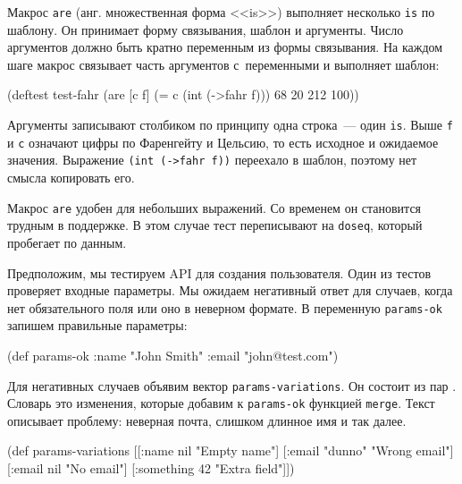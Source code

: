 
Макрос \verb|are| (анг. множественная форма <<is>>) выполняет несколько
\verb|is| по шаблону. Он принимает форму связывания, шаблон и аргументы. Число
аргументов должно быть кратно переменным из формы связывания. На каждом шаге
макрос связывает часть аргументов с~переменными и выполняет шаблон:

\begin{english}
  \begin{clojure}
(deftest test-fahr
  (are [c f] (= c (int (->fahr f)))
    68 20
    212 100))
  \end{clojure}
\end{english}

Аргументы записывают столбиком по принципу одна строка~--- один
\verb|is|. Выше \verb|f| и \verb|c| означают цифры по Фаренгейту и
Цельсию, то есть исходное и ожидаемое значения. Выражение \verb|(int (->fahr f))|
переехало в шаблон, поэтому нет смысла копировать его.

Макрос \verb|are| удобен для небольших выражений. Со временем он становится
трудным в поддержке. В этом случае тест переписывают на \verb|doseq|, который
пробегает по данным.

Предположим, мы тестируем API для создания пользователя. Один из тестов
проверяет входные параметры. Мы ожидаем негативный ответ для случаев, когда нет
обязательного поля или оно в неверном формате. В переменную \verb|params-ok|
запишем правильные параметры:

\begin{english}
  \begin{clojure}
(def params-ok {:name "John Smith" :email "john@test.com"})
  \end{clojure}
\end{english}

Для негативных случаев объявим вектор \verb|params-variations|. Он состоит из
пар . Словарь это изменения, которые добавим к
\verb|params-ok| функцией \verb|merge|. Текст описывает проблему: неверная
почта, слишком длинное имя и так далее.

\begin{english}
  \begin{clojure}
(def params-variations
  [[{:name nil}      "Empty name"]
   [{:email "dunno"} "Wrong email"]
   [{:email nil}     "No email"]
   [{:something 42}  "Extra field"]])
  \end{clojure}
\end{english}

